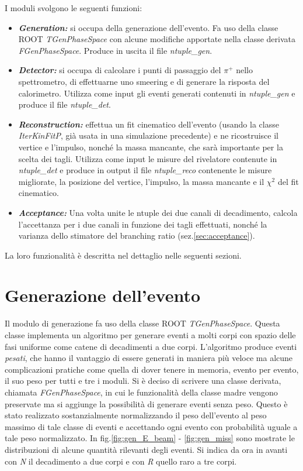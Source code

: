 \documentclass[8pt]{extarticle}
\begin{document}
I moduli svolgono le seguenti funzioni: \\
\begin{itemize}
\item \textbf{\textit{Generation:}} si occupa della generazione dell'evento. Fa uso della classe ROOT \textit{TGenPhaseSpace} con alcune modifiche apportate nella classe derivata \textit{FGenPhaseSpace}. Produce in uscita il file \textit{ntuple\_gen}.\\
\item \textbf{\textit{Detector:}} si occupa di calcolare i punti di passaggio del $\pi^+$ nello spettrometro, di effettuarne uno smeering e di generare la risposta del calorimetro. Utilizza come input gli eventi generati contenuti in \textit{ntuple\_gen} e produce il file \textit{ntuple\_det}.\\
\item \textbf{\textit{Reconstruction:}} effettua un fit cinematico dell'evento (usando la classe \textit{IterKinFitP}, già usata in una simulazione precedente\cite{spettrometro}) e ne ricostruisce il vertice e l'impulso, nonché la massa mancante, che sarà importante per la scelta dei tagli. Utilizza come input le misure del rivelatore contenute in \textit{ntuple\_det} e produce in output il file \textit{ntuple\_reco} contenente le misure migliorate, la posizione del vertice, l'impulso, la massa mancante e il $\chi^2$ del fit cinematico.\\
\item \textbf{\textit{Acceptance:}} Una volta unite le ntuple dei due canali di decadimento, calcola l'accettanza per i due canali in funzione dei tagli effettuati, nonché la varianza dello stimatore del branching ratio (sez.\ref{sec:acceptance}).
\end{itemize}

La loro funzionalità è descritta nel dettaglio nelle seguenti sezioni.

\section{Generazione dell'evento} \label{sec:generation}
Il modulo di generazione fa uso della classe ROOT \textit{TGenPhaseSpace}. Questa classe implementa un algoritmo per generare eventi a molti corpi con spazio delle fasi uniforme come catene di decadimenti a due corpi. L'algoritmo produce eventi \textit{pesati}, che hanno il vantaggio di essere generati in maniera più veloce ma alcune complicazioni pratiche come quella di dover tenere in memoria, evento per evento, il suo peso per tutti e tre i moduli. Si è deciso di scrivere una classe derivata, chiamata \textit{FGenPhaseSpace}, in cui le funzionalità della classe madre vengono preservate ma si aggiunge la possibilità di generare eventi senza peso. Questo è stato realizzato sostanzialmente normalizzando il peso dell'evento al peso massimo di tale classe di eventi e accettando ogni evento con probabilità uguale a tale peso normalizzato. In fig.\ref{fig:gen_E_beam} - \ref{fig:gen_miss} sono mostrate le distribuzioni di alcune quantità rilevanti degli eventi. Si indica da ora in avanti con \textit{N} il decadimento a due corpi e con \textit{R} quello raro a tre corpi. 
\end{document}
